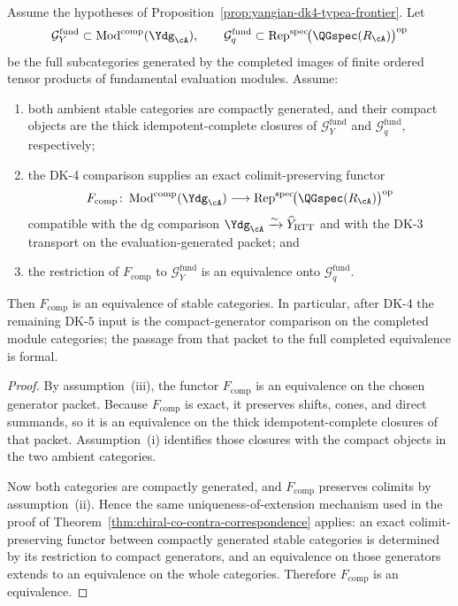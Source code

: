 \begin{proposition}
\label{prop:yangian-dk5-compact-generators}
Assume the hypotheses of
Proposition~\ref{prop:yangian-dk4-typea-frontier}.  Let
\[
\mathcal{G}^{\mathrm{fund}}_{Y}
\subset \operatorname{Mod}^{\mathrm{comp}}(\Ydg_{\cA}),
\qquad
\mathcal{G}^{\mathrm{fund}}_{q}
\subset \operatorname{Rep}^{\mathrm{spec}}\!
  \bigl(\QGspec(R_{\cA})\bigr)^{\mathrm{op}}
\]
be the full subcategories generated by the completed images of finite
ordered tensor products of fundamental evaluation modules.  Assume:
\begin{enumerate}[label=\textup{(\roman*)}]
\item both ambient stable categories are compactly generated, and
  their compact objects are the thick idempotent-complete closures of
  $\mathcal{G}^{\mathrm{fund}}_{Y}$ and
  $\mathcal{G}^{\mathrm{fund}}_{q}$, respectively;
\item the DK-4 comparison supplies an exact colimit-preserving functor
  \[
  F_{\mathrm{comp}}\colon
  \operatorname{Mod}^{\mathrm{comp}}(\Ydg_{\cA})
  \longrightarrow
  \operatorname{Rep}^{\mathrm{spec}}\!
    \bigl(\QGspec(R_{\cA})\bigr)^{\mathrm{op}}
  \]
  compatible with the dg comparison
  $\Ydg_{\cA}\xrightarrow{\sim}\widehat Y_{\mathrm{RTT}}$ and with the
  DK-3 transport on the evaluation-generated packet; and
\item the restriction of $F_{\mathrm{comp}}$ to
  $\mathcal{G}^{\mathrm{fund}}_{Y}$ is an equivalence onto
  $\mathcal{G}^{\mathrm{fund}}_{q}$.
\end{enumerate}
Then $F_{\mathrm{comp}}$ is an equivalence of stable categories.  In
particular, after DK-4 the remaining DK-5 input is the compact-generator
comparison on the completed module categories; the passage from that
packet to the full completed equivalence is formal.
\end{proposition}

\begin{proof}
By assumption~\textup{(iii)}, the functor
$F_{\mathrm{comp}}$ is an equivalence on the chosen generator packet.
Because $F_{\mathrm{comp}}$ is exact, it preserves shifts, cones, and
direct summands, so it is an equivalence on the thick idempotent-complete
closures of that packet.  Assumption~\textup{(i)} identifies those
closures with the compact objects in the two ambient categories.

Now both categories are compactly generated, and
$F_{\mathrm{comp}}$ preserves colimits by assumption~\textup{(ii)}.
Hence the same uniqueness-of-extension mechanism used in the proof of
Theorem~\ref{thm:chiral-co-contra-correspondence} applies: an exact
colimit-preserving functor between compactly generated stable
categories is determined by its restriction to compact generators, and
an equivalence on those generators extends to an equivalence on the
whole categories.  Therefore $F_{\mathrm{comp}}$ is an equivalence.
\end{proof}


